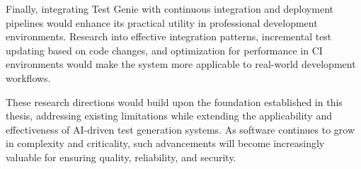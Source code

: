 Finally, integrating Test Genie with continuous integration and deployment pipelines would enhance its practical utility in professional development environments. Research into effective integration patterns, incremental test updating based on code changes, and optimization for performance in CI environments would make the system more applicable to real-world development workflows.

These research directions would build upon the foundation established in this thesis, addressing existing limitations while extending the applicability and effectiveness of AI-driven test generation systems. As software continues to grow in complexity and criticality, such advancements will become increasingly valuable for ensuring quality, reliability, and security.